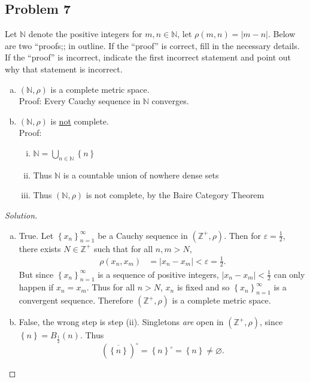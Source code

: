 \documentclass[12pt]{article}
\newcommand{\n}{\mathbb{N}}
\newcommand{\z}{\mathbb{Z}}
\newcommand{\ita}[1]{\textit{#1}}
\newcommand\paren[1]{\left( #1 \right)}
\newcommand\setb[1]{\left \{ #1 \right \}}
\newcommand{\eps}{\varepsilon}
\theoremstyle{definition}
\begin{document}
\subsection{Problem 7}
Let $\n$ denote the positive integers for $m , n \in \n$, let $\rho(m,n) = |m-n|$. Below are two ``proofs;; in outline. If the ``proof'' is correct, fill in the necessary details. If the ``proof'' is incorrect, indicate the first incorrect statement and point out why that statement is incorrect.
\begin{enumerate}[(a)]
    \item $(\n,\rho)$ is a complete metric space. \\
    Proof: Every Cauchy sequence in $\n$ converges.
    \item $(\n,\rho)$ is \underline{not} complete. \\
    Proof: 
    \begin{enumerate}[i)]
        \item $\displaystyle \n = \bigcup\limits_{n \in \n} \setb{ n }$
        \item Thus $\n$ is a countable union of nowhere dense sets
        \item Thus $(\n,\rho)$ is not complete, by the Baire Category Theorem
    \end{enumerate}
\end{enumerate}
\begin{proof}[Solution]
    \noindent
    \begin{enumerate}[(a)]
        \item True. Let $\setb{ x_n }_{n=1}^{\infty}$ be a Cauchy sequence in $( \z^+ , \rho )$. Then for $\eps = \frac{1}{2}$, there exists $N \in \z^+$ such that for all $n , m > N$, 
        \begin{align*}
            \rho(x_n , x_m) & = |x_n - x_m| < \eps = \frac{1}{2}.
        \end{align*}
        But since $\setb{ x_n }_{n=1}^{\infty}$ is a sequence of positive integers, $|x_n - x_m| < \frac{1}{2}$ can only happen if $x_n = x_m$. Thus for all $n > N$, $x_n$ is fixed and so $\setb{ x_n }_{n=1}^{\infty}$ is a convergent sequence. Therefore $( \z^+ , \rho )$ is a complete metric space.
        \item False, the wrong step is step (ii). Singletons \ita{are} open in $( \z^+ , \rho )$, since $\setb{ n } = B_{\frac{1}{2}}(n)$. Thus 
        \[
            \paren{ \overline{ \setb{ n } } }^{\circ} = \setb{ n }^{\circ} = \setb{ n } \neq \varnothing.
        \]
    \end{enumerate}
\end{proof}
\end{document}
